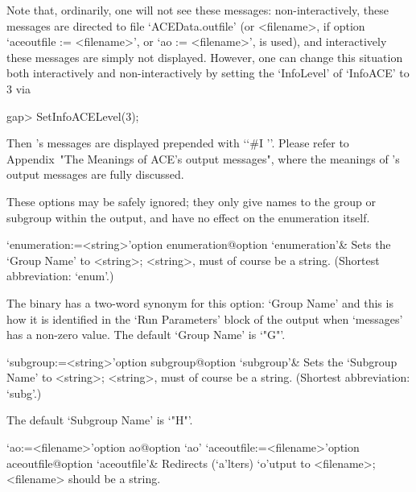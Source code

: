 Note   that,  ordinarily,  one   will   not   see   these    messages:
non-interactively,   these   messages    are    directed    to    file
`ACEData.outfile'   (or   <filename>,   if   option   `aceoutfile   :=
<filename>', or `ao := <filename>', is used), and interactively  these
messages are simply  not  displayed.  However,  one  can  change  this
situation both interactively and   non-interactively  by  setting  the
`InfoLevel' of `InfoACE' to 3 via

\begintt
gap> SetInfoACELevel(3);
\endtt

Then {\ACE}'s messages are  displayed  prepended  with  \lq{}`\#I  ''.
Please refer to Appendix~"The  Meanings  of  ACE's  output  messages",
where the meanings of {\ACE}'s output messages are fully discussed.

\enditems


These options may be safely ignored; they only give names to the group
or subgroup within the {\ACE}  output,  and  have  no  effect  on  the
enumeration itself.

\beginitems

\>`enumeration:=<string>'{option enumeration}@{option `enumeration'}&
Sets the `Group Name' to <string>;  <string>,  must  of  course  be  a
string. (Shortest abbreviation: `enum'.)

The {\ACE} binary has a two-word synonym for this option: `Group Name'
and this is how it is identified in the \lq{}Run Parameters' block  of
the {\ACE} output when `messages' has a non-zero  value.  The  default
`Group Name' is `"G"'.

\>`subgroup:=<string>'{option subgroup}@{option `subgroup'}& Sets the `Subgroup Name' to
<string>; <string>, must of course be a string.
(Shortest abbreviation: `subg'.) 

The default `Subgroup Name' is `"H"'.

\enditems


\beginitems

\>`ao:=<filename>'{option ao}@{option `ao'}
\>`aceoutfile:=<filename>'{option aceoutfile}@{option `aceoutfile'}&
Redirects (`a'lters) `o'utput to <filename>; <filename>  should  be  a
string.

